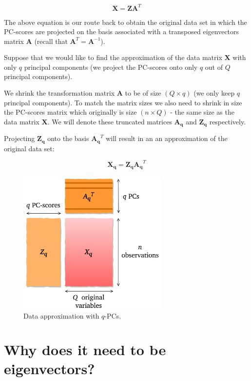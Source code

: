 \documentclass[10pt,twocolumn]{article}
\begin{document}
\begin{equation}
\bm{X} = \bm{Z} \bm{A}^T
\end{equation}

The above equation is our route back to obtain the original data set in which the PC-scores are projected on the basis associated with a transposed eigenvectors matrix $\bm{A}$ (recall that $\bm{A}^T = \bm{A}^{-1}$).

Suppose that we would like to find the approximation of the data matrix $\bm{X}$ with only $q$ principal components (we project the PC-scores onto only $q$ out of $Q$ principal components).

We shrink the transformation matrix $\bm{A}$ to be of size $(Q \times q)$ (we only keep $q$ principal components). To match the matrix sizes we also need to shrink in size the PC-scores matrix which originally is size $(n \times Q)$ - the same size as the data matrix $\bm{X}$. We will denote these truncated matrices $\bm{A_q}$ and $\bm{Z_q}$ respectively.

Projecting $\bm{Z_q}$ onto the basis $\bm{A_q}^T$ will result in an an approximation of the original data set:

\begin{equation}
\bm{X_q} = \bm{Z_q} \bm{A_q}^T
\end{equation}


\begin{figure}[H]
\centering\includegraphics[width=7.5cm]{data-approx.png}
\caption{Data approximation with $q$-PCs.}
\label{fig:data-approx}
\end{figure}




\section{Why does it need to be eigenvectors?}
\end{document}
